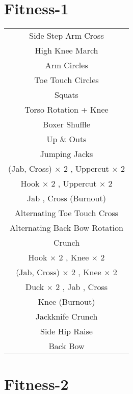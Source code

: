 \documentclass[12pt]{article}
\newcommand\myPadding{1.5}
\begin{document}

\section{Fitness-1}





\begin{center}
  \bgroup
  \def\arraystretch{\myPadding}%
  \begin{tabular}{ c  }
  Side Step Arm Cross
  \\
  High Knee March
  \\
  Arm Circles
  \\
  Toe Touch Circles
  \\
  Squats
  \\
  Torso Rotation + Knee
  \\
  Boxer Shuffle
  \\
  Up \& Outs
  \\
  Jumping Jacks
  \\
  (Jab, Cross) $\times$ 2 , Uppercut $\times$ 2
  \\
  Hook $\times$ 2 , Uppercut $\times$ 2
  \\
  Jab , Cross (Burnout)
  \\
  Alternating Toe Touch Cross
  \\
  Alternating Back Bow Rotation
  \\
  Crunch
  \\
  Hook $\times$ 2 , Knee $\times$ 2
  \\
  (Jab, Cross) $\times$ 2 , Knee $\times$ 2
  \\
  Duck $\times$ 2 , Jab , Cross
  \\
  Knee (Burnout)
  \\
  Jackknife Crunch
  \\
  Side Hip Raise
  \\
  Back Bow
  \end{tabular}
  \egroup
\end{center}





\newpage


\section{Fitness-2}
\end{document}
